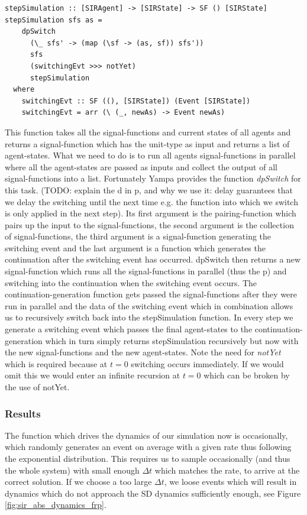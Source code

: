 \begin{verbatim}
stepSimulation :: [SIRAgent] -> [SIRState] -> SF () [SIRState]
stepSimulation sfs as =
    dpSwitch
      (\_ sfs' -> (map (\sf -> (as, sf)) sfs'))
      sfs
      (switchingEvt >>> notYet) 
      stepSimulation
  where
    switchingEvt :: SF ((), [SIRState]) (Event [SIRState])
    switchingEvt = arr (\ (_, newAs) -> Event newAs)
\end{verbatim}

This function takes all the signal-functions and current states of all agents and returns a signal-function which has the unit-type as input and returns a list of agent-states. What we need to do is to run all agents signal-functions in parallel where all the agent-states are passed as inputs and collect the output of all signal-functions into a list. Fortunately Yampa provides the function \textit{dpSwitch} for this task. (TODO: explain the d in p, and why we use it: delay guarantees that we delay the switching until the next time e.g. the function into which we switch is only applied in the next step). Its first argument is the pairing-function which pairs up the input to the signal-functions, the second argument is the collection of signal-functions, the third argument is a signal-function generating the switching event and the last argument is a function which generates the continuation after the switching event has occurred.
dpSwitch then returns a new signal-function which runs all the signal-functions in parallel (thus the p) and switching into the continuation when the switching event occurs. The continuation-generation function gets passed the signal-functions after they were run in parallel and the data of the switching event which in combination allows us to recursively switch back into the stepSimulation function. In every step we generate a switching event which passes the final agent-states to the continuation-generation which in turn simply returns stepSimulation recursively but now with the new signal-functions and the new agent-states. Note the need for \textit{notYet} which is required because at $t = 0$ switching occurs immediately. If we would omit this we would enter an infinite recursion at $t = 0$ which can be broken by the use of notYet. 

\subsubsection{Results}
The function which drives the dynamics of our simulation now is occasionally, which randomly generates an event on average with a given rate thus following the exponential distribution. This requires us to sample occasionally (and thus the whole system) with small enough $\Delta t$ which matches the rate, to arrive at the correct solution. If we choose a too large $\Delta t$, we loose events which will result in dynamics which do not approach the SD dynamics sufficiently enough, see Figure \ref{fig:sir_abs_dynamics_frp}.

